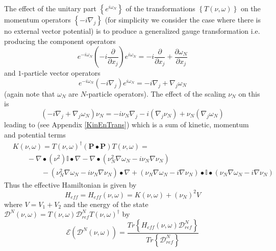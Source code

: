 \documentclass[aps,preprint]{revtex4}%
\begin{document}
The effect of the unitary part $\left\{  e^{i\omega_{N}}\right\}  $ of the
transformations $\left\{  T\left(  \nu,\omega\right)  \right\}  $ on the
momentum operators $\left\{  -i\nabla_{j}\right\}  $ (for simplicity we
consider the case where there is no external vector potential) is to produce a
generalized gauge transformation i.e. producing the component operators
\begin{equation}
e^{-i\omega_{N}}\left(  -i\frac{\partial}{\partial x_{j}}\right)
e^{i\omega_{N}}=-i\frac{\partial}{\partial x_{j}}+\frac{\partial\omega_{N}%
}{\partial x_{j}}%
\end{equation}
and $1$-particle vector operators
\begin{equation}
e^{-i\omega_{N}}\left(  -i\nabla_{j}\right)  e^{i\omega_{N}}=-i\nabla
_{j}+\nabla_{j}\omega_{N}%
\end{equation}
(again note that $\omega_{N}$ are $N$-particle operators). The effect of the
scaling $\nu_{N}$ on this is
\begin{equation}
\left(  -i\nabla_{j}+\nabla_{j}\omega_{N}\right)  \nu_{N}=-i\nu_{N}\nabla
_{j}-i\left(  \nabla_{j}\nu_{N}\right)  +\nu_{N}\left(  \nabla_{j}\omega
_{N}\right)
\end{equation}
leading to (see Appendix \ref{KinEnTrans}) which is a sum of kinetic, momentum
and potential terms
\begin{align}
&  K\left(  \nu,\omega\right)  =T\left(  \nu,\omega\right)  ^{\dagger}\left(
\mathbf{P\bullet P}\right)  T\left(  \nu,\omega\right)  =\nonumber\\
&  \qquad-\nabla\bullet\left(  \nu^{2}\right)  \mathbb{I}\bullet\nabla
-\nabla\bullet\left(  \nu_{N}^{2}\nabla\omega_{N}-i\nu_{N}\nabla\nu_{N}\right)
\nonumber\\
&  \qquad\qquad-\left(  \nu_{N}^{2}\nabla\omega_{N}-i\nu_{N}\nabla\nu
_{N}\right)  \bullet\nabla+\left(  \nu_{N}\nabla\omega_{N}-i\nabla\nu
_{N}\right)  \bullet\mathbb{I}\bullet\left(  \nu_{N}\nabla\omega_{N}%
-i\nabla\nu_{N}\right)  \label{effkin}%
\end{align}
Thus the effective Hamiltonian is given by%
\begin{equation}
H_{eff}=H_{eff}\left(  \nu,\omega\right)  =K\left(  \nu,\omega\right)
+\left(  \nu_{N}\right)  ^{2}V \label{effham2}%
\end{equation}
where $V=V_{1}+V_{2}$ and the energy of the state $\mathcal{D}^{N}\left(
\nu,\omega\right)  =T\left(  \nu,\omega\right)  \mathcal{D}_{ref}^{N}T\left(
\nu,\omega\right)  ^{\dagger}$ by
\begin{equation}
\mathcal{E}\left(  \mathcal{D}^{N}\left(  \nu,\omega\right)  \right)
=\frac{Tr\left\{  H_{eff}\left(  \nu,\omega\right)  \mathcal{D}_{ref}%
^{N}\right\}  }{Tr\left\{  \mathcal{D}_{ref}^{N}\right\}  } \label{Enpar}%
\end{equation}
\end{document}
